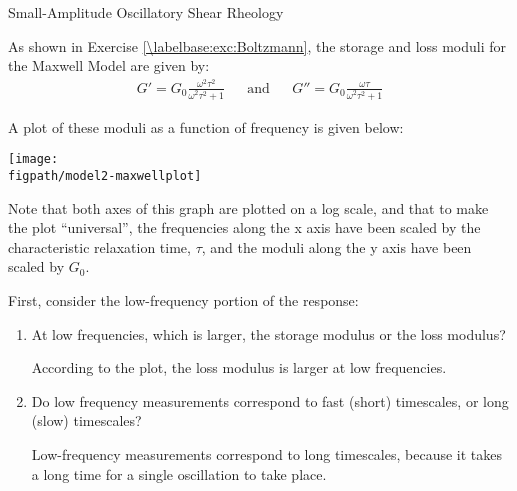 \begin{activity}[extension]{Small-Amplitude Oscillatory Shear Rheology}
\begin{ctqs}
\end{ctqs}

\clearpage
\begin{model}
\label{\labelbase:mdl:dynamicmoduli}
	As shown in Exercise \ref{\labelbase:exc:Boltzmann}, the storage and loss moduli for the Maxwell Model are given by:
	\begin{align*}
		G' = G_0 \frac{\omega^2 \tau^2}{\omega^2 \tau^2 + 1} && \text{and} && G'' = G_0 \frac{\omega \tau}{\omega^2 \tau^2 + 1}
	\end{align*}
	
	A plot of these moduli as a function of frequency is given below:
			
		\vspace{0.1in}	
		\centerline{\texttt{[image: \\figpath/model2-maxwellplot]}}
	
	Note that both axes of this graph are plotted on a log scale, and that to make the plot ``universal'', the frequencies along the x axis have been scaled by the characteristic relaxation time, $\tau$, and the moduli along the y axis have been scaled by $G_0$.
	
\end{model}

\begin{ctqs}
	
	\question First, consider the low-frequency portion of the response:
	
		\begin{enumerate}
		
			\item  At low frequencies, which is larger, the storage modulus or the loss modulus?
	
					\begin{solution}[1in]{}
					
						According to the plot, the loss modulus is larger at low frequencies.
					
					\end{solution}
					
			\item Do low frequency measurements correspond to fast (short) timescales, or long (slow) timescales?
			
				\begin{solution}[1in]{}
				
					Low-frequency measurements correspond to long timescales, because it takes a long time for a single oscillation to take place.
				

\end{solution}
\end{enumerate}
\end{ctqs}
\end{activity}
